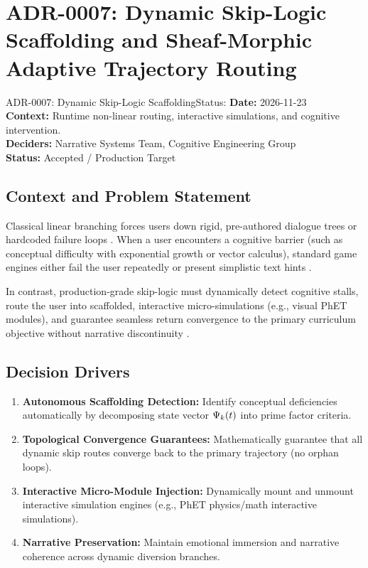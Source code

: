 \section{ADR-0007: Dynamic Skip-Logic Scaffolding and Sheaf-Morphic Adaptive Trajectory Routing}
\label{sec:adr0007}

\begin{adrbox}{ADR-0007: Dynamic Skip-Logic Scaffolding}{Status: }
\textbf{Date:} 2026-11-23 \\
\textbf{Context:} Runtime non-linear routing, interactive simulations, and cognitive intervention. \\
\textbf{Deciders:} Narrative Systems Team, Cognitive Engineering Group \\
\textbf{Status:} Accepted / Production Target
\end{adrbox}

\subsection{Context and Problem Statement}
Classical linear branching forces users down rigid, pre-authored dialogue trees or hardcoded failure loops \cite{nystrom2014game}. When a user encounters a cognitive barrier (such as conceptual difficulty with exponential growth or vector calculus), standard game engines either fail the user repeatedly or present simplistic text hints \cite{mourokh2024qari}. 

In contrast, production-grade skip-logic must dynamically detect cognitive stalls, route the user into scaffolded, interactive micro-simulations (e.g., visual PhET modules), and guarantee seamless return convergence to the primary curriculum objective without narrative discontinuity \cite{mourokh2024qari}.

\subsection{Decision Drivers}
\begin{enumerate}[label=\bfseries D\arabic*.]
    \item \textbf{Autonomous Scaffolding Detection:} Identify conceptual deficiencies automatically by decomposing state vector $\Psi_k(t)$ into prime factor criteria.
    \item \textbf{Topological Convergence Guarantees:} Mathematically guarantee that all dynamic skip routes converge back to the primary trajectory (no orphan loops).
    \item \textbf{Interactive Micro-Module Injection:} Dynamically mount and unmount interactive simulation engines (e.g., PhET physics/math interactive simulations).
    \item \textbf{Narrative Preservation:} Maintain emotional immersion and narrative coherence across dynamic diversion branches.
\end{enumerate}

